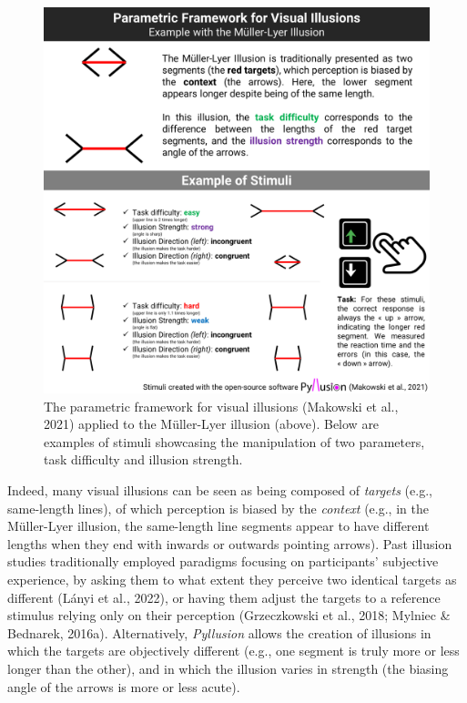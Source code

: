 \documentclass[
  man,floatsintext]{apa6}
\begin{document}
\begin{figure}
\includegraphics[width=1\linewidth]{figures/Figure1} \caption{The parametric framework for visual illusions (Makowski et al., 2021) applied to the Müller-Lyer illusion (above). Below are examples of stimuli showcasing the manipulation of two parameters, task difficulty and illusion strength.}\label{fig:unnamed-chunk-2}
\end{figure}

Indeed, many visual illusions can be seen as being composed of \emph{targets} (e.g., same-length lines), of which perception is biased by the \emph{context} (e.g., in the Müller-Lyer illusion, the same-length line segments appear to have different lengths when they end with inwards or outwards pointing arrows).
Past illusion studies traditionally employed paradigms focusing on participants' subjective experience, by asking them to what extent they perceive two identical targets as different (Lányi et al., 2022), or having them adjust the targets to a reference stimulus relying only on their perception (Grzeczkowski et al., 2018; Mylniec \& Bednarek, 2016a).
Alternatively, \emph{Pyllusion} allows the creation of illusions in which the targets are objectively different (e.g., one segment is truly more or less longer than the other), and in which the illusion varies in strength (the biasing angle of the arrows is more or less acute).
\end{document}
